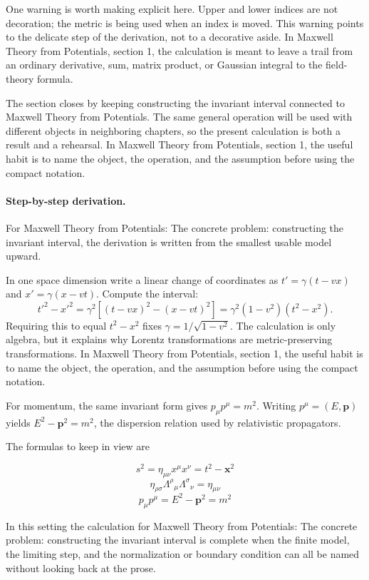 One warning is worth making explicit here.  Upper and lower indices are not decoration; the metric is being used when an index is moved.  This warning points to the delicate step of the derivation, not to a decorative aside.  In Maxwell Theory from Potentials, section 1, the calculation is meant to leave a trail from an ordinary derivative, sum, matrix product, or Gaussian integral to the field-theory formula.

The section closes by keeping constructing the invariant interval connected to Maxwell Theory from Potentials.  The same general operation will be used with different objects in neighboring chapters, so the present calculation is both a result and a rehearsal.  In Maxwell Theory from Potentials, section 1, the useful habit is to name the object, the operation, and the assumption before using the compact notation.



\paragraph{Step-by-step derivation.}

For Maxwell Theory from Potentials: The concrete problem: constructing the invariant interval, the derivation is written from the smallest usable model upward.

In one space dimension write a linear change of coordinates as \(t'=\gamma(t-vx)\) and \(x'=\gamma(x-vt)\).  Compute the interval:
\[
  t'^2-x'^2
  =
  \gamma^2[(t-vx)^2-(x-vt)^2]
  =
  \gamma^2(1-v^2)(t^2-x^2).
\]
Requiring this to equal \(t^2-x^2\) fixes \(\gamma=1/\sqrt{1-v^2}\).  The calculation is only algebra, but it explains why Lorentz transformations are metric-preserving transformations.  In Maxwell Theory from Potentials, section 1, the useful habit is to name the object, the operation, and the assumption before using the compact notation.

For momentum, the same invariant form gives \(p_\mu p^\mu=m^2\).  Writing \(p^\mu=(E,\bm p)\) yields \(E^2-\bm p^2=m^2\), the dispersion relation used by relativistic propagators.

The formulas to keep in view are

\[
  s^2=\eta_{\mu\nu}x^\mu x^\nu=t^2-\bm x^2
\]
\[
  \eta_{\rho\sigma}\Lambda^\rho{}_\mu\Lambda^\sigma{}_\nu=\eta_{\mu\nu}
\]
\[
  p_\mu p^\mu=E^2-\bm p^2=m^2
\]

In this setting the calculation for Maxwell Theory from Potentials: The concrete problem: constructing the invariant interval is complete when the finite model, the limiting step, and the normalization or boundary condition can all be named without looking back at the prose.




